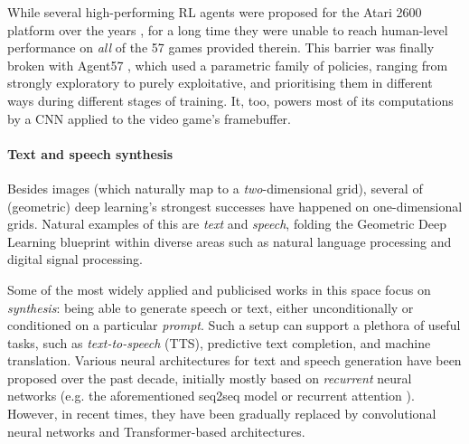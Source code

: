 While several high-performing RL agents were proposed for the Atari 2600 platform over the years \citep{mnih2015human,mnih2016asynchronous,schulman2017proximal}, for a long time they were unable to reach human-level performance on \emph{all} of the 57 games provided therein. This barrier was finally broken with Agent57 \citep{badia2020agent57}, which used a parametric family of policies, ranging from strongly exploratory to purely exploitative, and prioritising them in different ways during different stages of training. It, too, powers most of its computations by a CNN applied to the video game's framebuffer.

\paragraph{Text and speech synthesis} Besides images (which naturally map to a \emph{two}-dimensional grid), several of (geometric) deep learning's strongest successes have happened on one-dimensional grids. Natural examples of this are \emph{text} and \emph{speech}, folding the Geometric Deep Learning blueprint within diverse areas such as natural language processing and digital signal processing.

Some of the most widely applied and publicised works in this space focus on \emph{synthesis}: being able to generate speech or text, either unconditionally or conditioned on a particular \emph{prompt}. Such a setup can support a plethora of useful tasks, such as  \emph{text-to-speech} (TTS), predictive text completion, and machine translation. Various neural architectures for text and speech generation have been proposed over the past decade, initially mostly based on \emph{recurrent} neural networks (e.g. the aforementioned seq2seq model \citep{sutskever2014sequence} or recurrent attention \citep{bahdanau2014neural}). However, in recent times, they have been gradually replaced by convolutional neural networks and Transformer-based architectures.

